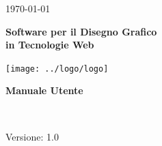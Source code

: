 \usepackage{multirow}
\title{\TITOLODOC}
\author{Marco Cunico}
 


\renewcommand{\insertversion}{1.0} %
\renewcommand{\TITOLODOC}{Manuale Utente} %
\renewcommand{\glosspath}{.\glossario} %
 
\begin{titlepage}
\begin{center}
  \begin{Large}  \today \end{Large}
\end{center}
 
\vspace{20pt}
 
\begin{center}
  \begin{Huge}
        \textbf{\ajax}
  \end{Huge}
\end{center}      
 
\begin{center}
  \begin{large}
        \textbf{Software per il Disegno Grafico\\ in Tecnologie Web}
  \end{large}
\end{center}      
 
\vspace{20pt}
 
\begin{center}
\texttt{[image: ../logo/logo]}
\end{center}
 
\vspace{170pt}
\begin{center} %
  \begin{Huge}
        \textbf{\TITOLODOC}
  \end{Huge}
      \\
\end{center}
\vspace{190pt}
\begin{center}
Versione: \insertversion
\end{center}
\end{titlepage}
 
